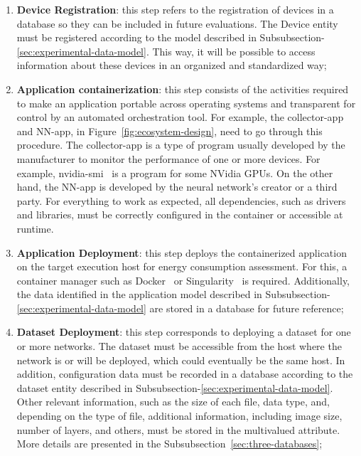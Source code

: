 \begin{enumerate}
    \item \textbf{Device Registration}: this step refers to the registration of devices in a database so they can be included in future evaluations. The Device entity must be registered according to the model described in Subsubsection-\ref{sec:experimental-data-model}. This way, it will be possible to access information about these devices in an organized and standardized way;

    \item \textbf{Application containerization}: 
    this step consists of the activities required to make an application portable across operating systems and transparent for control by an automated orchestration tool. For example, the collector-app and NN-app, in Figure~\ref{fig:ecosystem-design}, need to go through this procedure. The collector-app is a type of program usually developed by the manufacturer to monitor the performance of one or more devices. For example, nvidia-smi~\cite{nvidia-smi:2020} is a program for some NVidia GPUs. On the other hand, the NN-app is developed by the neural network’s creator or a third party. For everything to work as expected, all dependencies, such as drivers and libraries, must be correctly configured in the container or accessible at runtime.
    
    \item \textbf{Application Deployment}: this step deploys the containerized application on the target execution host for energy consumption assessment. For this, a container manager such as Docker~\cite{docker:2020} or Singularity~\cite{singularity:2020} is required. Additionally, the data identified in the application model described in Subsubsection-\ref{sec:experimental-data-model} are stored in a database for future reference;
    
    \item \textbf{Dataset Deployment}: this step corresponds to deploying a dataset for one or more networks. The dataset must be accessible from the host where the network is or will be deployed, which could eventually be the same host. In addition, configuration data must be recorded in a database according to the dataset entity described in Subsubsection-\ref{sec:experimental-data-model}. Other relevant information, such as the size of each file, data type, and, depending on the type of file, additional information, including image size, number of layers, and others, must be stored in the multivalued attribute. More details are presented in the Subsubsection~\ref{sec:three-databases};


\end{enumerate}
